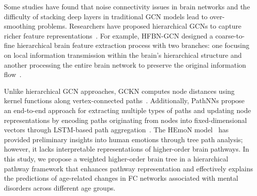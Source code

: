 Some studies have found that noise connectivity issues in brain networks and the difficulty of stacking deep layers in traditional GCN models lead to over-smoothing problems. Researchers have proposed hierarchical GCNs to capture richer feature representations~\cite{li2022te}. For example, HFBN-GCN designed a coarse-to-fine hierarchical brain feature extraction process with two branches: one focusing on local information transmission within the brain's hierarchical structure and another processing the entire brain network to preserve the original information flow~\cite{mei2022modular}.

Unlike hierarchical GCN approaches, GCKN computes node distances using kernel functions along vertex-connected paths~\cite{chen2020convolutional}. Additionally, PathNNs propose an end-to-end approach for extracting multiple types of paths and updating node representations by encoding paths originating from nodes into fixed-dimensional vectors through LSTM-based path aggregation~\cite{michel2023path}. The HEmoN model~\cite{huang2025identifying} has provided preliminary insights into human emotions through tree path analysis; however, it lacks interpretable representations of higher-order brain pathways. In this study, we propose a weighted higher-order brain tree in a hierarchical pathway framework that enhances pathway representation and effectively explains the predictions of age-related changes in FC networks associated with mental disorders across different age groups.